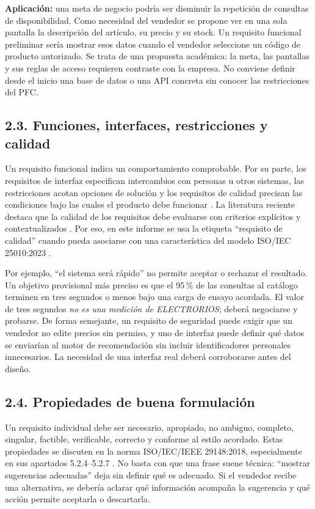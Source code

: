 \textbf{Aplicaci\'on:} una meta de negocio podr\'ia ser disminuir la repetici\'on de consultas de disponibilidad. Como necesidad del vendedor se propone ver en una sola pantalla la descripci\'on del art\'iculo, su precio y su stock. Un requisito funcional preliminar ser\'ia mostrar esos datos cuando el vendedor seleccione un c\'odigo de producto autorizado. Se trata de una propuesta acad\'emica: la meta, las pantallas y sus reglas de acceso requieren contraste con la empresa. No conviene definir desde el inicio una base de datos o una API concreta sin conocer las restricciones del PFC.

\subsection{2.3. Funciones, interfaces, restricciones y calidad}
Un requisito funcional indica un comportamiento comprobable. Por su parte, los requisitos de interfaz especifican intercambios con personas u otros sistemas, las restricciones acotan opciones de soluci\'on y los requisitos de calidad precisan las condiciones bajo las cuales el producto debe funcionar \cite{iso29148}. La literatura reciente destaca que la calidad de los requisitos debe evaluarse con criterios explícitos y contextualizados \cite{montgomery2022}. Por eso, en este informe se usa la etiqueta ``requisito de calidad'' cuando pueda asociarse con una caracter\'istica del modelo ISO/IEC 25010:2023 \cite{iso25010}.

Por ejemplo, ``el sistema ser\'a r\'apido'' no permite aceptar o rechazar el resultado. Un objetivo provisional m\'as preciso es que el 95\,\% de las consultas al cat\'alogo terminen en tres segundos o menos bajo una carga de ensayo acordada. El valor de tres segundos \emph{no es una medici\'on de ELECTRORIOS}; deber\'a negociarse y probarse. De forma semejante, un requisito de seguridad puede exigir que un vendedor no edite precios sin permiso, y uno de interfaz puede definir qu\'e datos se enviar\'ian al motor de recomendaci\'on sin incluir identificadores personales innecesarios. La necesidad de una interfaz real deber\'a corroborarse antes del dise\~no.

\subsection{2.4. Propiedades de buena formulaci\'on}
Un requisito individual debe ser necesario, apropiado, no ambiguo, completo, singular, factible, verificable, correcto y conforme al estilo acordado. Estas propiedades se discuten en la norma ISO/IEC/IEEE 29148:2018, especialmente en sus apartados 5.2.4--5.2.7 \cite{iso29148}. No basta con que una frase suene t\'ecnica: ``mostrar sugerencias adecuadas'' deja sin definir qu\'e es adecuado. Si el vendedor recibe una alternativa, se deber\'ia aclarar qu\'e informaci\'on acompa\~na la sugerencia y qu\'e acci\'on permite aceptarla o descartarla.

